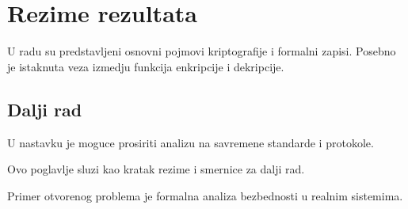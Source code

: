 \section{Rezime rezultata}
U radu su predstavljeni osnovni pojmovi kriptografije i formalni zapisi.
Posebno je istaknuta veza izmedju funkcija enkripcije i dekripcije.

\subsection{Dalji rad}
U nastavku je moguce prosiriti analizu na savremene standarde i protokole.

\begin{remark}
Ovo poglavlje sluzi kao kratak rezime i smernice za dalji rad.
\end{remark}

\begin{example}
Primer otvorenog problema je formalna analiza bezbednosti u realnim sistemima.
\end{example}
